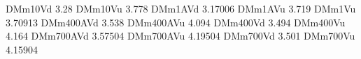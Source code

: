 DMm10Vd 3.28
DMm10Vu 3.778
DMm1AVd 3.17006
DMm1AVu 3.719
DMm1Vu 3.70913
DMm400AVd 3.538
DMm400AVu 4.094
DMm400Vd 3.494
DMm400Vu 4.164
DMm700AVd 3.57504
DMm700AVu 4.19504
DMm700Vd 3.501
DMm700Vu 4.15904
